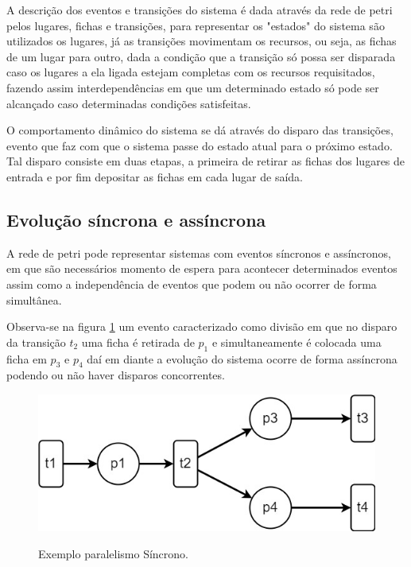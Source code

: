 A descrição dos eventos e transições do sistema é dada através da rede de petri pelos lugares, fichas e transições, para representar os "estados" do sistema são utilizados os lugares, já as transições movimentam os recursos, ou seja, as fichas de um lugar para outro, dada a condição que a transição só possa ser disparada caso os lugares a ela ligada estejam completas com os recursos requisitados, fazendo assim interdependências em que um determinado estado só pode ser alcançado caso determinadas condições satisfeitas.

O comportamento dinâmico do sistema se dá através do disparo das transições, evento que faz com que o sistema passe do estado atual para o próximo estado. Tal disparo consiste em duas etapas, a primeira de retirar as fichas dos lugares de entrada e por fim depositar as fichas em cada lugar de saída.

\subsection{Evolução síncrona e assíncrona}
A rede de petri pode representar sistemas com eventos síncronos e assíncronos, em que são necessários momento de espera para acontecer determinados eventos assim como a independência de eventos que podem ou não ocorrer de forma simultânea.

Observa-se na figura \ref{fig:paralelismo_sincrono} um evento caracterizado como divisão em que no disparo da transição $t_2$ uma ficha é retirada de $p_1$ e simultaneamente é colocada uma ficha em $p_3$ e $p_4$ daí em diante a evolução do sistema ocorre de forma assíncrona podendo ou não haver disparos concorrentes.  

\begin{figure}[ht]
    \centering
    \caption{Exemplo paralelismo Síncrono.}
    \includegraphics[scale=0.4]{figures/Petri/paralelismo_sincrono.jpg}
    \label{fig:paralelismo_sincrono}
\end{figure}

